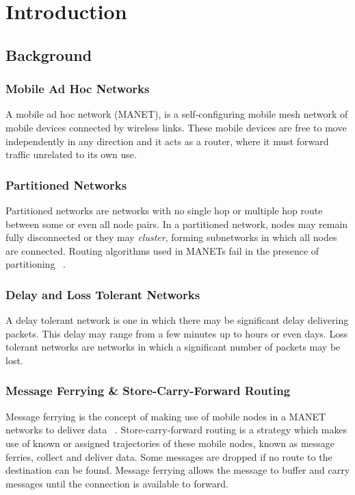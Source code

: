 \chapter{Introduction} 

\section{Background}

\subsection{Mobile Ad Hoc Networks}
A mobile ad hoc network (MANET),  is a self-configuring mobile mesh network of mobile devices connected by wireless links.  
These mobile devices are free to move independently in any direction and it acts as a router, where it must forward traffic unrelated to its own use. 

\subsection{Partitioned Networks}
Partitioned networks are networks with no single hop or multiple hop route between some or even all node pairs. %
In a partitioned network, nodes may remain fully disconnected or they may \emph{cluster}, forming subnetworks in which all nodes are connected.
Routing algorithms used in MANETs %
fail in the presence of partitioning ~\cite{Routing}.

\subsection{Delay and Loss Tolerant Networks}
\label{sec:delay_loss_tolerant}
A delay tolerant network is one in which there may be significant delay delivering packets.
This delay may range from a few minutes up to hours or even days. %
Loss tolerant networks are networks in which a significant number of packets may be lost.

\subsection{Message Ferrying \& Store-Carry-Forward Routing}
\label{sec:ferrying_overview}
Message ferrying is the concept of making use of mobile nodes in a MANET networks to deliver data ~\cite{adhocmsgferry}.
Store-carry-forward routing is a strategy which makes use of known or assigned trajectories of these mobile nodes, known as message ferries, collect and deliver data.
Some messages are dropped if no route to the destination can be found.  
Message ferrying allows the message to buffer and carry messages until the connection is available to forward.

